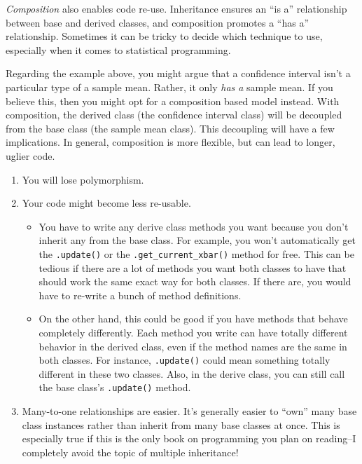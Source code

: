 \documentclass[
  12pt,
  krantz2]{krantz}
\begin{document}
\emph{Composition} also enables code re-use. Inheritance ensures an ``is a'' relationship between base and derived classes, and composition promotes a ``has a'' relationship. Sometimes it can be tricky to decide which technique to use, especially when it comes to statistical programming.

Regarding the example above, you might argue that a confidence interval isn't a particular type of a sample mean. Rather, it only \emph{has a} sample mean. If you believe this, then you might opt for a composition based model instead. With composition, the derived class (the confidence interval class) will be decoupled from the base class (the sample mean class). This decoupling will have a few implications. In general, composition is more flexible, but can lead to longer, uglier code.

\begin{enumerate}
\def\labelenumi{\arabic{enumi}.}
\item
  You will lose polymorphism.
\item
  Your code might become less re-usable.

  \begin{itemize}
  \item
    You have to write any derive class methods you want because you don't inherit any from the base class. For example, you won't automatically get the \texttt{.update()} or the \texttt{.get\_current\_xbar()} method for free. This can be tedious if there are a lot of methods you want both classes to have that should work the same exact way for both classes. If there are, you would have to re-write a bunch of method definitions.
  \item
    On the other hand, this could be good if you have methods that behave completely differently. Each method you write can have totally different behavior in the derived class, even if the method names are the same in both classes. For instance, \texttt{.update()} could mean something totally different in these two classes. Also, in the derive class, you can still call the base class's \texttt{.update()} method.
  \end{itemize}
\item
  Many-to-one relationships are easier. It's generally easier to ``own'' many base class instances rather than inherit from many base classes at once. This is especially true if this is the only book on programming you plan on reading--I completely avoid the topic of multiple inheritance!
\end{enumerate}
\end{document}
